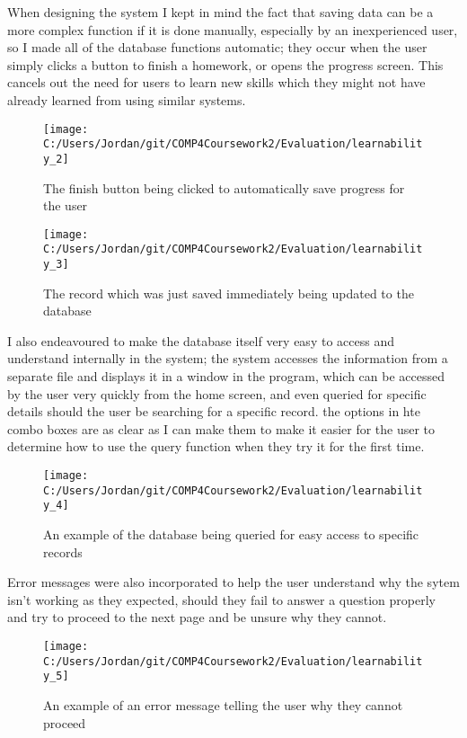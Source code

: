 When designing the system I kept in mind the fact that saving data can be a more complex function if it is done manually, especially by an inexperienced user, so I made all of the database functions automatic; they occur when the user simply clicks a button to finish a homework, or opens the progress screen. This cancels out the need for users to learn new skills which they might not have already learned from using similar systems.

\begin{figure}[H]
	\texttt{[image: C:/Users/Jordan/git/COMP4Coursework2/Evaluation/learnability\_2]}
	\caption{The finish button being clicked to automatically save progress for the user}
\end{figure}

\begin{figure}[H]
	\texttt{[image: C:/Users/Jordan/git/COMP4Coursework2/Evaluation/learnability\_3]}
	\caption{The record which was just saved immediately being updated to the database}
\end{figure}

I also endeavoured to make the database itself very easy to access and understand internally in the system; the system accesses the information from a separate file and displays it in a window in the program, which can be accessed by the user very quickly from the home screen, and even queried for specific details should the user be searching for a specific record. the options in hte combo boxes are as clear as I can make them to make it easier for the user to determine how to use the query function when they try it for the first time.

\begin{figure}[H]
	\texttt{[image: C:/Users/Jordan/git/COMP4Coursework2/Evaluation/learnability\_4]}
	\caption{An example of the database being queried for easy access to specific records}
\end{figure}

Error messages were also incorporated to help the user understand why the sytem isn't working as they expected, should they fail to answer a question properly and try to proceed to the next page and be unsure why they cannot.

\begin{figure}[H]
	\texttt{[image: C:/Users/Jordan/git/COMP4Coursework2/Evaluation/learnability\_5]}
	\caption{An example of an error message telling the user why they cannot proceed}
\end{figure}

